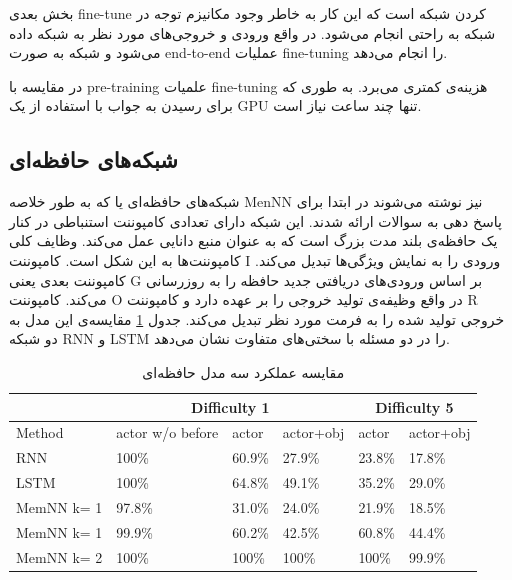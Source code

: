 \documentclass[12pt, a4paper, oneside]{report}
\begin{document}
بخش بعدی
fine-tune
کردن شبکه است که این کار به خاطر وجود مکانیزم توجه در شبکه به راحتی انجام می‌شود.
در واقع ورودی و خروجی‌های مورد نظر به شبکه داده می‌شود و شبکه به صورت
end-to-end
عملیات
fine-tuning
را انجام می‌دهد.

در مقایسه با
pre-training
علمیات
fine-tuning
هزینه‌ی کمتری می‌برد. به طوری که برای رسیدن به جواب با استفاده از یک
GPU
تنها چند ساعت نیاز است.\cite{devlin2018bert}



\subsection{شبکه‌های حافظه‌ای}
شبکه‌های حافظه‌ای یا
که به طور خلاصه
MenNN
نیز نوشته می‌شوند در ابتدا برای پاسخ دهی به سوالات ارائه شدند. این شبکه دارای تعدادی کامپوننت استنباطی در کنار یک
حافظه‌ی بلند مدت بزرگ است که به عنوان منبع دانایی عمل می‌کند. وظایف کلی کامپوننت‌ها به این شکل است. کامپوننت
I
ورودی را به نمایش ویژگی‌ها تبدیل می‌کند. کامپوننت بعدی یعنی
G
بر اساس ورودی‌های دریافتی جدید حافظه را به روزرسانی می‌کند. کامپوننت
O
در واقع وظیفه‌ی تولید خروجی را بر عهده دارد و کامپوننت
R
خروجی تولید شده را به فرمت مورد نظر تبدیل می‌کند. جدول
\ref{tab:MemNN-vs-others}
مقایسه‌ی این مدل به دو شبکه
RNN
و
LSTM
را در دو مسئله با سختی‌های متفاوت نشان می‌دهد.
\cite{zhang2018deep}

\begin{table}[h]
    \begin{small}
    \begin{center}
      \begin{latin}
      \begin{tabular}{|l||l|l|l||l|l|}
        \hline
         & \multicolumn{3}{c|}{Difficulty 1} & \multicolumn{2}{c|}{Difficulty 5} \\
        \hline
        Method & actor w/o before & actor & actor+obj & actor & actor+obj \\
        \hline
        RNN & 100\% & 60.9\% & 27.9\% & 23.8\% & 17.8\% \\
        LSTM & 100\% & 64.8\% & 49.1\% & 35.2\% & 29.0\% \\
        \hline
        MemNN k= 1 & 97.8\% & 31.0\% & 24.0\% & 21.9\% & 18.5\% \\
        MemNN k= 1 & 99.9\% & 60.2\% & 42.5\% & 60.8\% & 44.4\% \\
        MemNN k= 2 & 100\% & 100\% & 100\% & 100\% & 99.9\% \\
        \hline
      \end{tabular}
      \end{latin}
      \caption{مقایسه عملکرد سه مدل حافظه‌ای}
      \label{tab:MemNN-vs-others}
    \end{center}
\end{small}
  \end{table}
\end{document}
